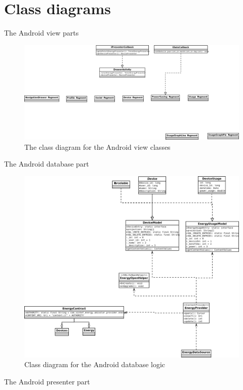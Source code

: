 \section{Class diagrams}

The Android view parts
\begin{figure}[H]
\includegraphics[width=\textwidth]{ch/architecture/fig/ClassDiagramAndroid.png}
\caption{The class diagram for the Android view classes}
\end{figure}

The Android database part
\begin{figure}[H]
\includegraphics[width=\textwidth]{ch/architecture/fig/classDiagramAndroidDatabase.png}
\caption{Class diagram for the Android database logic}
\end{figure}

The Android presenter part
